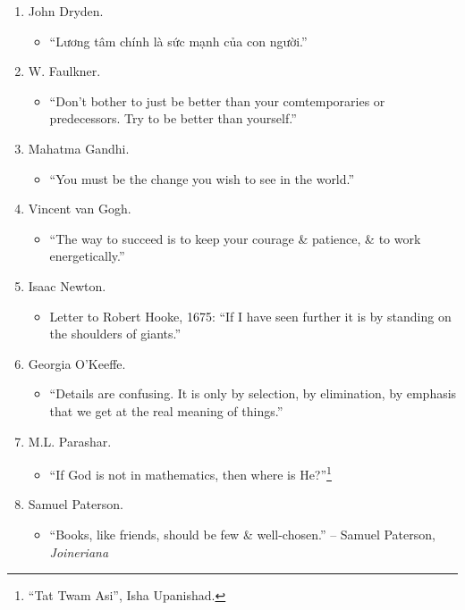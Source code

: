 \documentclass{article}
\begin{document}
\begin{enumerate}
\begin{itemize}
		\item ``1 đứa trẻ kiêu căng, tự phụ hoặc 1 đứa trẻ tự ti, sợ hãi không phải là mục tiêu giáo dục của chúng ta.''
	\end{itemize}
	\item {\sc John Dryden.}
	\begin{itemize}
		\item ``Lương tâm chính là sức mạnh của con người.''
	\end{itemize}
	\item {\sc W. Faulkner.}
	\begin{itemize}
		\item ``Don't bother to just be better than your comtemporaries or predecessors. Try to be better than yourself.''
	\end{itemize}
	\item {\sc Mahatma Gandhi.}
	\begin{itemize}
		\item ``You must be the change you wish to see in the world.''
	\end{itemize}
	\item {\sc Vincent van Gogh.}
	\begin{itemize}
		\item ``The way to succeed is to keep your courage \& patience, \& to work energetically.''
	\end{itemize}
	\item {\sc Isaac Newton.}
	\begin{itemize}
		\item Letter to Robert Hooke, 1675: ``If I have seen further it is by standing on the shoulders of giants.''
	\end{itemize}
	\item {\sc Georgia O'Keeffe.}
	\begin{itemize}
		\item ``Details are confusing. It is only by selection, by elimination, by emphasis that we get at the real meaning of things.''
	\end{itemize}
	\item {\sc M.L. Parashar.}
	\begin{itemize}
		\item ``If God is not in mathematics, then where is He?''\footnote{``Tat Twam Asi'', Isha Upanishad.}
	\end{itemize}
	\item {\sc Samuel Paterson.}
	\begin{itemize}
		\item ``Books, like friends, should be few \& well-chosen.'' -- Samuel Paterson, {\it Joineriana}

\end{itemize}
\end{enumerate}
\end{document}
